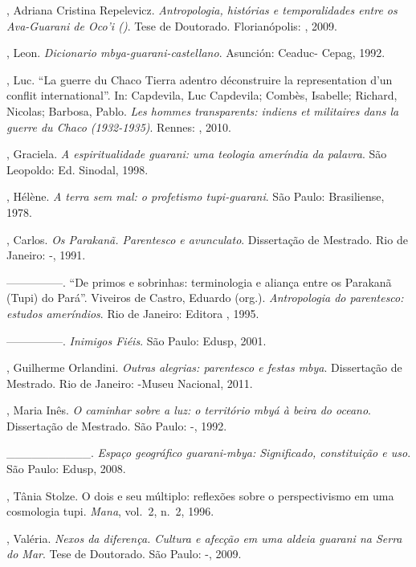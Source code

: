 {{\begin{Parskip}
, Adriana Cristina Repelevicz. \emph{Antropologia, histórias e
temporalidades entre os Ava-Guarani de Oco’i ()}. Tese de Doutorado.
Florianópolis: , 2009.

, Leon. \emph{Dicionario mbya-guarani-castellano}. Asunción: Ceaduc-
Cepag, 1992.

, Luc. ``La guerre du Chaco Tierra adentro déconstruire la
representation d’un conflit international''. In: Capdevila, Luc
Capdevila; Combès, Isabelle; Richard, Nicolas; Barbosa, Pablo. \emph{Les
hommes transparents: indiens et militaires dans la guerre du Chaco
(1932-1935)}. Rennes: , 2010.

, Graciela. \emph{A espiritualidade guarani: uma teologia ameríndia
da palavra}. São Leopoldo: Ed. Sinodal, 1998.

, Hélène. \emph{A terra sem mal: o profetismo tupi-guarani}. São Paulo:
Brasiliense, 1978.

, Carlos. \emph{Os Parakanã. Parentesco e avunculato}. Dissertação de
Mestrado. Rio de Janeiro: -, 1991.

—————. ``De primos e sobrinhas: terminologia e aliança entre os Parakanã
(Tupi) do Pará''. Viveiros de Castro, Eduardo (org.). \emph{Antropologia do
parentesco: estudos ameríndios}. Rio de Janeiro: Editora , 1995.

—————. \emph{Inimigos Fiéis}. São Paulo: Edusp, 2001.

, Guilherme Orlandini. \emph{Outras alegrias: parentesco e festas mbya}.
 Dissertação de Mestrado. Rio de Janeiro: -Museu Nacional, 2011.

, Maria Inês. \emph{O caminhar sobre a luz: o território mbyá à beira
do oceano}. Dissertação de Mestrado. São Paulo: -, 1992.

\_\_\_\_\_\_\_\_\_\_. \emph{Espaço geográfico guarani-mbya: Significado,
constituição e uso}. São Paulo: Edusp, 2008.

, Tânia Stolze. O dois e seu múltiplo: reflexões sobre o
perspectivismo em uma cosmologia tupi. \emph{Mana}, vol.~2, n.~2, 1996.

, Valéria. \emph{Nexos da diferença. Cultura e afecção em uma aldeia
guarani na Serra do Mar}. Tese de Doutorado. São Paulo: -, 2009.


\end{Parskip}}}
